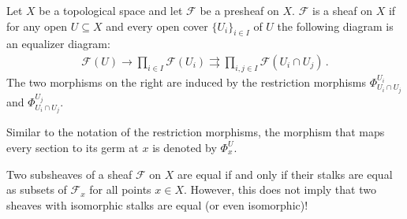     \begin{property}
        Let $X$ be a topological space and let $\mathcal{F}$ be a presheaf on $X$. $\mathcal{F}$ is a sheaf on $X$ if for any open $U\subseteq X$ and every open cover $\{U_i\}_{i\in I}$ of $U$ the following diagram is an equalizer diagram:
        \begin{gather}
            \label{sheaf:equalizer}
            \mathcal{F}(U)\rightarrow\prod_{i\in I}\mathcal{F}(U_i)\rightrightarrows\prod_{i, j\in I}\mathcal{F}(U_i\cap U_j)\,.
        \end{gather}
        The two morphisms on the right are induced by the restriction morphisms $\Phi^{U_i}_{U_i\cap U_j}$ and $\Phi^{U_j}_{U_i\cap U_j}$.
    \end{property}

    \begin{notation}
        Similar to the notation of the restriction morphisms, the morphism that maps every section to its germ at $x$ is denoted by $\Phi^U_x$.
    \end{notation}

    \begin{property}
        Two subsheaves of a sheaf $\mathcal{F}$ on $X$ are equal if and only if their stalks are equal as subsets of $\mathcal{F}_x$ for all points $x\in X$. However, this does not imply that two sheaves with isomorphic stalks are equal (or even isomorphic)!
    \end{property}

